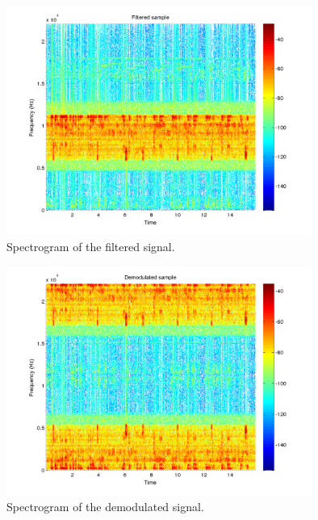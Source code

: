 \begin{figure}[]
  \begin{center}
    \hspace*{-1in}
    \includegraphics[width=100mm]{q1_filtered_spectrogram}
    \caption{Spectrogram of the filtered signal. 
      \label{fig:q1_filtered_spectrogram}}
  \end{center}  
\end{figure}


\begin{figure}[]
  \begin{center}
    \hspace*{-1in}
    \includegraphics[width=100mm]{q1_demodulated_spectrogram}
    \caption{Spectrogram of the demodulated signal. 
    \label{fig:q1_demodulated_spectrogram}}
  \end{center}  
\end{figure}


